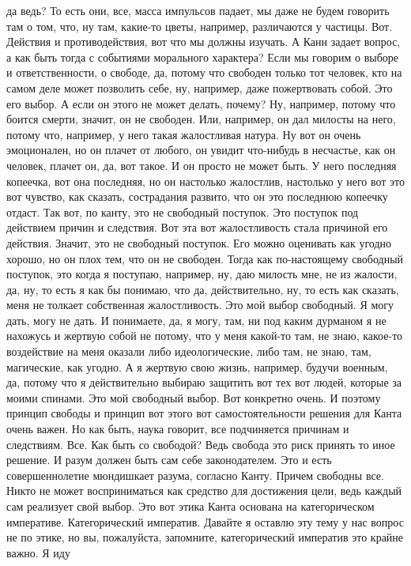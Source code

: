 да ведь? То есть они, все, масса импульсов падает, мы даже не будем говорить там
о том, что, ну там, какие-то цветы, например, различаются у частицы. Вот.
Действия и противодействия, вот что мы должны изучать. А Канн задает вопрос, а
как быть тогда с событиями морального характера? Если мы говорим о выборе и
ответственности, о свободе, да, потому что свободен только тот человек, кто на
самом деле может позволить себе, ну, например, даже пожертвовать собой. Это его
выбор. А если он этого не может делать, почему? Ну, например, потому что боится
смерти, значит, он не свободен. Или, например, он дал милосты на него, потому
что, например, у него такая жалостливая натура. Ну вот он очень эмоционален, но
он плачет от любого, он увидит что-нибудь в несчастье, как он человек, плачет
он, да, вот такое. И он просто не может быть. У него последняя копеечка, вот она
последняя, но он настолько жалостлив, настолько у него вот это вот чувство, как
сказать, сострадания развито, что он это последнюю копеечку отдаст. Так вот, по
канту, это не свободный поступок. Это поступок под действием причин и следствия.
Вот эта вот жалостливость стала причиной его действия. Значит, это не свободный
поступок. Его можно оценивать как угодно хорошо, но он плох тем, что он не
свободен. Тогда как по-настоящему свободный поступок, это когда я поступаю,
например, ну, даю милость мне, не из жалости, да, ну, то есть я как бы понимаю,
что да, действительно, ну, то есть как сказать, меня не толкает собственная
жалостливость. Это мой выбор свободный. Я могу дать, могу не дать. И понимаете,
да, я могу, там, ни под каким дурманом я не нахожусь и жертвую собой не потому,
что у меня какой-то там, не знаю, какое-то воздействие на меня оказали либо
идеологические, либо там, не знаю, там, магические, как угодно. А я жертвую свою
жизнь, например, будучи военным, да, потому что я действительно выбираю защитить
вот тех вот людей, которые за моими спинами. Это мой свободный выбор. Вот
конкретно очень. И поэтому принцип свободы и принцип вот этого вот
самостоятельности решения для Канта очень важен. Но как быть, наука говорит, все
подчиняется причинам и следствиям. Все. Как быть со свободой? Ведь свобода это
риск принять то иное решение. И разум должен быть сам себе законодателем. Это и
есть совершеннолетие мюндишкает разума, согласно Канту. Причем свободны все.
Никто не может восприниматься как средство для достижения цели, ведь каждый сам
реализует свой выбор. Это вот этика Канта основана на категорическом императиве.
Категорический императив. Давайте я оставлю эту тему у нас вопрос не по этике,
но вы, пожалуйста, запомните, категорический императив это крайне важно. Я иду
